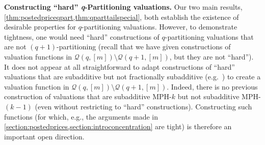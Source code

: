 \documentclass[11pt]{article}\usepackage{amsfonts}
\newtheorem{definition}[theorem]{Definition}
\newtheorem{problem}[theorem]{Problem}
\numberwithin{theorem}{subsection}
\def\hmath$#1${\texorpdfstring{{\rmfamily\textit{#1}}}{#1}}
\begin{document}
\iffalse 
\begin{problem}
\label{prob:closenessproblem}
What is the optimal value of $\alpha_{m,q,q+1}$ such that $\mathcal{Q}(q,[m])$ is 
$\alpha_{m,q,q+1}$-close to $\mathcal{Q}(q+1, [m])?$ More generally, for $2\le q \le p\le m,$ what is the 
optimal value of $\alpha_{m,q,p}$ such that $\mathcal{Q}(q,[m])$ is 
$\alpha_{m,q,p}$-close to $\mathcal{Q}(p, [m])?$
\end{problem}




\begin{definition}
\label{def:defofapproximation}
Let $\beta\ge 1.$
A class of valuations $\mathcal{F}$ $\beta$-approximates a class of valuations $\mathcal{G}$ over $[m]$ if for any $g\in \mathcal{G},$ there exists some $f\in \mathcal{F}$ such that 
$f(S)\le g(S)\le \beta f(S)$ holds for all $S\subseteq [m].$
\end{definition}



\begin{problem}
\label{prob:approximationproblem}
For $2\le q \le p\le m,$ what is the 
optimal value of $\beta_{m,q,p}$ such that $\mathcal{Q}(q,[m])$ is 
$\beta_{m,q,p}$-approximated by $\mathcal{Q}(p, [m])?$
\end{problem}

We make the trivial observation that if $\mathcal{Q}(p,[m])$ $\beta$-approximates $\mathcal{F},$ then 
$\mathcal{F}$ is $\frac{1}{\beta}$-close to $\mathcal{Q}(p,[m]).$ The converse also holds in the XOS case $q = m$ and is easy to show. 

\fi



\noindent\textbf{Constructing ``hard'' \hmath$q$-Partitioning valuations.}
Our two main results,
\cref{thm:postedpriceqpart,thm:qparttailspecial}, both establish the existence of desirable properties for $q$-partitioning valuations. However, to demonstrate tightness, one would need ``hard'' constructions of $q$-partitioning valuations that are not $(q+1)$-partitioning (recall that we have given constructions of valuation functions in $\mathcal{Q}(q,[m])\setminus \mathcal{Q}(q+1,[m])$, but they are not ``hard''). It does not appear at all straightforward to adapt constructions of ``hard'' valuations that are subadditive but not fractionally subadditive (e.g.~\cite{BhawalkarR11}) to create a valuation function in $\mathcal{Q}(q,[m])\setminus \mathcal{Q}(q+1,[m])$. Indeed, there is no previous construction of valuations that are subadditive MPH-$k$ but not subadditive MPH-$(k-1)$ (even without restricting to ``hard'' constructions). Constructing such functions (for which, e.g., the arguments made in \cref{section:postedprices,section:introconcentration} are tight) is therefore an important open direction.\\
\end{document}
